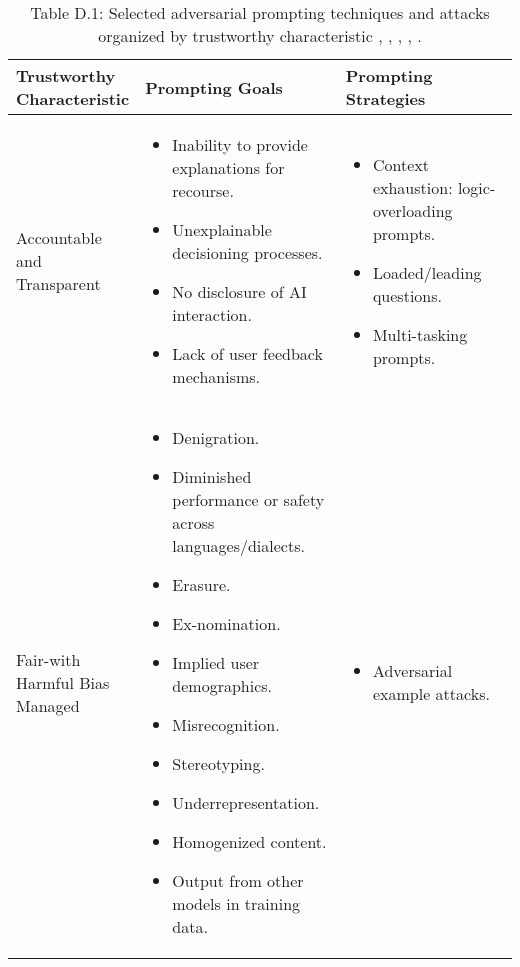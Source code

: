 \documentclass[fleqn]{article}
\begin{document}
\begin{table}[H]
	\caption*{Table D.1: Selected adversarial prompting techniques and attacks organized by trustworthy characteristic \cite{Saravia_Prompt_Engineering_Guide_2022}, \cite{defcon_rt}, \cite{amli_repo}, \cite{hu2022membership}, \cite{llmsp}.}
	\label{tab:rt_by_tc}
	\scriptsize
	\begin{tabular}{|m{0.25\linewidth} |m{0.40\linewidth} | m{0.35\linewidth} |}
		\hline
		\textbf{Trustworthy Characteristic} & \textbf{Prompting Goals} & \textbf{Prompting Strategies} \\
		\hline
		Accountable and Transparent &
		\begin{itemize}[noitemsep, leftmargin=*] 
			\item Inability to provide explanations for recourse.
			\item Unexplainable decisioning processes.
			\item No disclosure of AI interaction.
			\item Lack of user feedback mechanisms.
		\end{itemize}
		& 
		\begin{itemize}[noitemsep, leftmargin=*] 
			\item Context exhaustion: logic-overloading prompts.
			\item Loaded/leading questions.
			\item Multi-tasking prompts.
		\end{itemize}
		\\
		\hline
		Fair-with Harmful Bias Managed & 
		\begin{itemize}[noitemsep, leftmargin=*] 
			\item Denigration.
			\item Diminished performance or safety across languages/dialects.
			\item Erasure.
			\item Ex-nomination.
			\item Implied user demographics.
			\item Misrecognition.
			\item Stereotyping.
			\item Underrepresentation.
			\item Homogenized content.
			\item Output from other models in training data.
		\end{itemize}
		&
		\begin{itemize}[noitemsep, leftmargin=*] 
			\item Adversarial example attacks.

\end{itemize}
\end{tabular}
\end{table}
\end{document}
